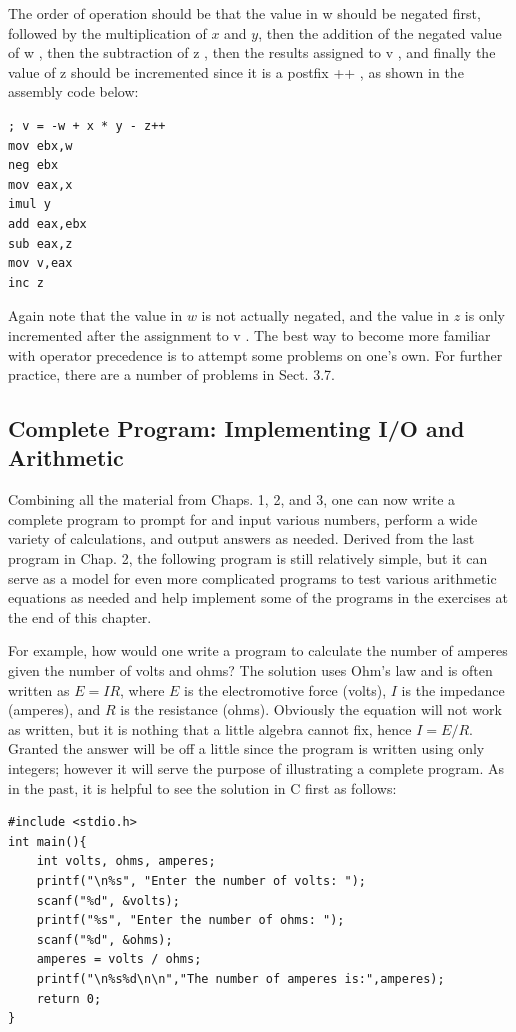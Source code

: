 \documentclass[10pt]{book}
\begin{document}
The order of operation should be that the value in w should be negated first, followed by the multiplication of $x$ and $y$, then the addition of the negated value of w , then the subtraction of z , then the results assigned to v , and finally the value of z should be incremented since it is a postfix ++ , as shown in the assembly code below:

\begin{verbatim}
; v = -w + x * y - z++
mov ebx,w
neg ebx
mov eax,x
imul y
add eax,ebx
sub eax,z
mov v,eax
inc z
\end{verbatim}

Again note that the value in $w$ is not actually negated, and the value in $z$ is only incremented after the assignment to v . The best way to become more familiar with operator precedence is to attempt some problems on one's own. For further practice, there are a number of problems in Sect. 3.7.

\subsection{Complete Program: Implementing I/O and Arithmetic}
Combining all the material from Chaps. 1, 2, and 3, one can now write a complete program to prompt for and input various numbers, perform a wide variety of calculations, and output answers as needed. Derived from the last program in Chap. 2, the following program is still relatively simple, but it can serve as a model for even more complicated programs to test various arithmetic equations as needed and help implement some of the programs in the exercises at the end of this chapter.

For example, how would one write a program to calculate the number of amperes given the number of volts and ohms? The solution uses Ohm's law and is often written as $E=I R$, where $E$ is the electromotive force (volts), $I$ is the impedance (amperes), and $R$ is the resistance (ohms). Obviously the equation will not work as written, but it is nothing that a little algebra cannot fix, hence $I=E / R$. Granted the answer will be off a little since the program is written using only integers; however it will serve the purpose of illustrating a complete program. As in the past, it is helpful to see the solution in C first as follows:

\begin{verbatim}
#include <stdio.h>
int main(){
    int volts, ohms, amperes;
    printf("\n%s", "Enter the number of volts: ");
    scanf("%d", &volts);
    printf("%s", "Enter the number of ohms: ");
    scanf("%d", &ohms);
    amperes = volts / ohms;
    printf("\n%s%d\n\n","The number of amperes is:",amperes);
    return 0;
}
\end{verbatim}
\end{document}
